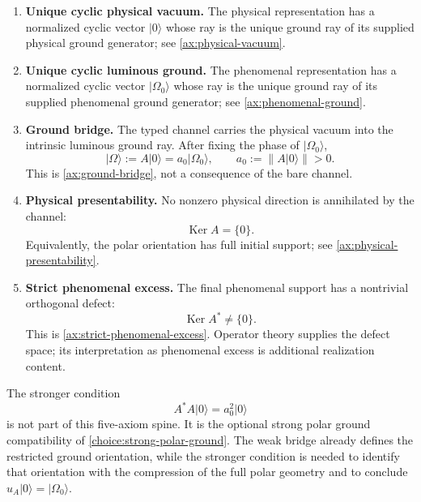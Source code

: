 \documentclass[11pt,reqno]{scrartcl}
\newcommand{\ket}[1]{\lvert #1\rangle}
\DeclareMathOperator{\Ker}{Ker}
\theoremstyle{plain}
\theoremstyle{definition}
\theoremstyle{remark}
\begin{document}
\begin{enumerate}[label=\textup{(R\arabic*)}]
  \item \textbf{Unique cyclic physical vacuum.}
  The physical representation has a normalized cyclic vector \(\ket0\) whose
  ray is the unique ground ray of its supplied physical ground generator;
  see \cref{ax:physical-vacuum}.

  \item \textbf{Unique cyclic luminous ground.}
  The phenomenal representation has a normalized cyclic vector
  \(\ket{\Omega_0}\) whose ray is the unique ground ray of its supplied
  phenomenal ground generator; see \cref{ax:phenomenal-ground}.

  \item \textbf{Ground bridge.}
  The typed channel carries the physical vacuum into the intrinsic luminous
  ground ray.  After fixing the phase of \(\ket{\Omega_0}\),
  \begin{equation}
    \ket\Omega:=A\ket0=a_0\ket{\Omega_0},
    \qquad
    a_0:=\|A\ket0\|>0.
    \label{eq:bridge-preview}
  \end{equation}
  This is \cref{ax:ground-bridge}, not a consequence of the bare channel.

  \item \textbf{Physical presentability.}
  No nonzero physical direction is annihilated by the channel:
  \begin{equation}
    \Ker A=\{0\}.
  \end{equation}
  Equivalently, the polar orientation has full initial support; see
  \cref{ax:physical-presentability}.

  \item \textbf{Strict phenomenal excess.}
  The final phenomenal support has a nontrivial orthogonal defect:
  \begin{equation}
    \Ker A^*\neq\{0\}.
  \end{equation}
  This is \cref{ax:strict-phenomenal-excess}.  Operator theory supplies the
  defect space; its interpretation as phenomenal excess is additional
  realization content.
\end{enumerate}

The stronger condition
\begin{equation}
  A^*A\ket0=a_0^2\ket0
\end{equation}
is not part of this five-axiom spine.  It is the optional strong polar ground
compatibility of \cref{choice:strong-polar-ground}.  The weak bridge already
defines the restricted ground orientation, while the stronger condition is
needed to identify that orientation with the compression of the full polar
geometry and to conclude \(u_A\ket0=\ket{\Omega_0}\).
\end{document}
